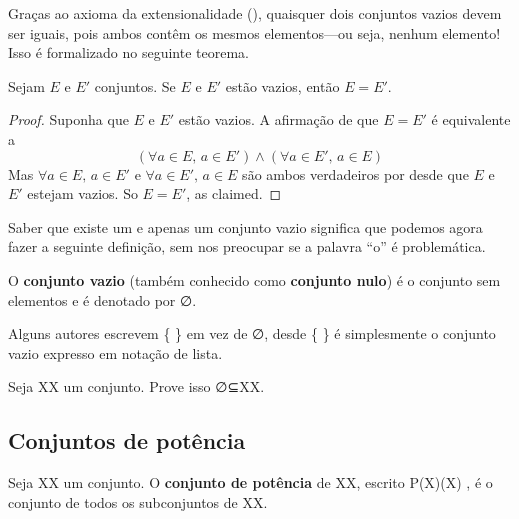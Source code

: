 Graças ao axioma da extensionalidade (), quaisquer dois conjuntos vazios devem ser iguais, pois ambos contêm os mesmos elementos---ou seja, nenhum elemento! Isso é formalizado no seguinte teorema.

\begin{theorem}
\label{thmEmptySetIsUnique}
Sejam $E$ e $E'$ conjuntos. Se $E$ e $E'$ estão vazios, então $E=E'$.
\end{theorem}
\begin{proof}
Suponha que $E$ e $E'$ estão vazios. A afirmação de que $E=E'$ é equivalente a
\[ (\forall a \in E,\, a \in E') \wedge (\forall a \in E',\, a \in E) \]
Mas $\forall a \in E,\, a \in E'$ e $\forall a \in E',\, a \in E$ são ambos verdadeiros por  desde que $E$ e $E'$ estejam vazios. So $E=E'$, as claimed.
\end{proof}

Saber que existe um e apenas um conjunto vazio significa que podemos agora fazer a seguinte definição, sem nos preocupar se a palavra “o” é problemática.

\begin{definition}
\label{defEmptySet}
O \textbf{conjunto vazio} (também conhecido como \textbf{conjunto nulo}) é o conjunto sem elementos e é denotado por ∅\varnothing {}.
\end{definition}

Alguns autores escrevem {}\{ \} em vez de ∅\varnothing, desde {}\{ \} é simplesmente o conjunto vazio expresso em notação de lista.

\begin{exercise}
\label{exEmptySetSubsetOfEverySet}
Seja XX um conjunto. Prove isso ∅⊆X\varnothing \subseteq X.
\end{exercise}

\subsection*{Conjuntos de potência}

\begin{definition}
\label{defPowerSet}
Seja XX um conjunto. O \textbf{conjunto de potência} de XX, escrito P(X)(X) , é o conjunto de todos os subconjuntos de XX.
\end{definition}

